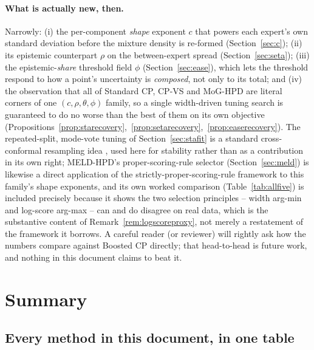 \documentclass[11pt]{article}
\begin{document}
\paragraph{What is actually new, then.} Narrowly: (i) the per-component \emph{shape} exponent $c$
that powers each expert's own standard deviation before the mixture density is re-formed
(Section~\ref{sec:c}); (ii) its epistemic counterpart $\rho$ on the between-expert spread
(Section~\ref{sec:seta}); (iii) the epistemic-\emph{share} threshold field $\phi$
(Section~\ref{sec:ease}), which lets the threshold respond to how a point's uncertainty is
\emph{composed}, not only to its total; and (iv) the observation that all of Standard CP, CP-VS and
MoG-HPD are literal corners of one $(c,\rho,\theta,\phi)$ family, so a single width-driven tuning
search is guaranteed to do no worse than the best of them on its own objective
(Propositions~\ref{prop:starecovery},~\ref{prop:setarecovery},~\ref{prop:easerecovery}). The
repeated-split, mode-vote tuning of Section~\ref{sec:stafit} is a standard cross-conformal
resampling idea \cite{gibbs2021adaptive}, used here for stability rather than as a contribution in
its own right; MELD-HPD's proper-scoring-rule selector (Section~\ref{sec:meld}) is likewise a
direct application of the strictly-proper-scoring-rule framework \cite{gneiting2007strictly} to
this family's shape exponents, and its own worked comparison (Table~\ref{tab:allfive}) is included
precisely because it shows the two selection principles -- width arg-min and log-score arg-max --
can and do disagree on real data, which is the substantive content of
Remark~\ref{rem:logscoreproxy}, not merely a restatement of the framework it borrows. A careful
reader (or reviewer) will rightly ask how the numbers compare against Boosted CP directly; that
head-to-head is future work, and nothing in this document claims to beat it.

\section{Summary}
\label{sec:summary}

\subsection{Every method in this document, in one table}
\end{document}
